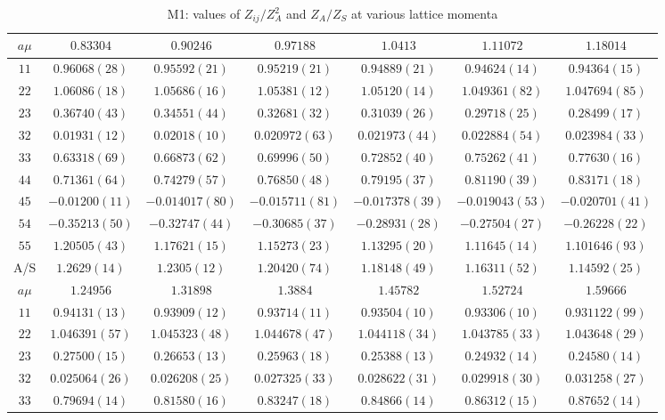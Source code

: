 \begin{table}
\begin{center}
\caption{M1: values of $Z_{ij}/Z_A^2$ and $Z_A/Z_S$ at various lattice momenta}
\begin{tabular}{c|c c c c c c}
\hline
\hline
$a\mu$ & $0.83304$ & $0.90246$ & $0.97188$ & $1.0413$ & $1.11072$ & $1.18014$ \\
\hline
$11$ & $0.96068(28)$ & $0.95592(21)$ & $0.95219(21)$ & $0.94889(21)$ & $0.94624(14)$ & $0.94364(15)$ \\
$22$ & $1.06086(18)$ & $1.05686(16)$ & $1.05381(12)$ & $1.05120(14)$ & $1.049361(82)$ & $1.047694(85)$ \\
$23$ & $0.36740(43)$ & $0.34551(44)$ & $0.32681(32)$ & $0.31039(26)$ & $0.29718(25)$ & $0.28499(17)$ \\
$32$ & $0.01931(12)$ & $0.02018(10)$ & $0.020972(63)$ & $0.021973(44)$ & $0.022884(54)$ & $0.023984(33)$ \\
$33$ & $0.63318(69)$ & $0.66873(62)$ & $0.69996(50)$ & $0.72852(40)$ & $0.75262(41)$ & $0.77630(16)$ \\
$44$ & $0.71361(64)$ & $0.74279(57)$ & $0.76850(48)$ & $0.79195(37)$ & $0.81190(39)$ & $0.83171(18)$ \\
$45$ & $-0.01200(11)$ & $-0.014017(80)$ & $-0.015711(81)$ & $-0.017378(39)$ & $-0.019043(53)$ & $-0.020701(41)$ \\
$54$ & $-0.35213(50)$ & $-0.32747(44)$ & $-0.30685(37)$ & $-0.28931(28)$ & $-0.27504(27)$ & $-0.26228(22)$ \\
$55$ & $1.20505(43)$ & $1.17621(15)$ & $1.15273(23)$ & $1.13295(20)$ & $1.11645(14)$ & $1.101646(93)$ \\
\hline
A/S & $1.2629(14)$ & $1.2305(12)$ & $1.20420(74)$ & $1.18148(49)$ & $1.16311(52)$ & $1.14592(25)$ \\
\hline
$a\mu$ & $1.24956$ & $1.31898$ & $1.3884$ & $1.45782$ & $1.52724$ & $1.59666$ \\
\hline
$11$ & $0.94131(13)$ & $0.93909(12)$ & $0.93714(11)$ & $0.93504(10)$ & $0.93306(10)$ & $0.931122(99)$ \\
$22$ & $1.046391(57)$ & $1.045323(48)$ & $1.044678(47)$ & $1.044118(34)$ & $1.043785(33)$ & $1.043648(29)$ \\
$23$ & $0.27500(15)$ & $0.26653(13)$ & $0.25963(18)$ & $0.25388(13)$ & $0.24932(14)$ & $0.24580(14)$ \\
$32$ & $0.025064(26)$ & $0.026208(25)$ & $0.027325(33)$ & $0.028622(31)$ & $0.029918(30)$ & $0.031258(27)$ \\
$33$ & $0.79694(14)$ & $0.81580(16)$ & $0.83247(18)$ & $0.84866(14)$ & $0.86312(15)$ & $0.87652(14)$ \\

\end{tabular}
\end{center}
\end{table}
